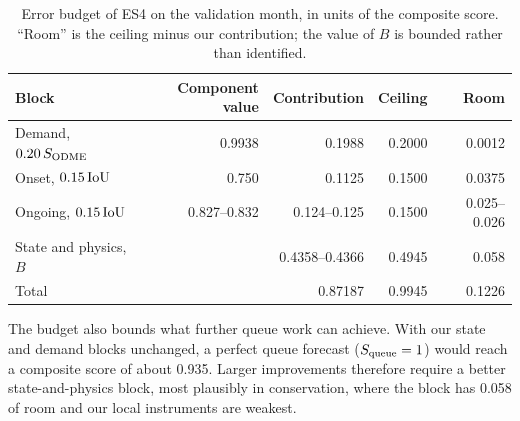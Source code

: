 \begin{table}[h]
\centering\small
\caption{Error budget of ES4 on the validation month, in units of the composite score. ``Room'' is the ceiling minus
our contribution; the value of $B$ is bounded rather than identified.}\label{tab:budget}
\begin{tabular}{@{}l r r r r@{}}
\toprule
Block & Component value & Contribution & Ceiling & Room \\
\midrule
Demand, $0.20\,S_{\mathrm{ODME}}$ & 0.9938 & 0.1988 & 0.2000 & 0.0012 \\
Onset, $0.15\,\mathrm{IoU}$ & 0.750 & 0.1125 & 0.1500 & 0.0375 \\
Ongoing, $0.15\,\mathrm{IoU}$ & 0.827--0.832 & 0.124--0.125 & 0.1500 & 0.025--0.026 \\
State and physics, $B$ & & 0.4358--0.4366 & 0.4945 & 0.058 \\
\midrule
Total & & 0.87187 & 0.9945 & 0.1226 \\
\bottomrule
\end{tabular}
\end{table}

The budget also bounds what further queue work can achieve. With our state and demand blocks unchanged, a perfect
queue forecast ($S_{\mathrm{queue}}=1$) would reach a composite score of about 0.935. Larger improvements therefore require a
better state-and-physics block, most plausibly in conservation, where the block has 0.058 of room and our local
instruments are weakest.

